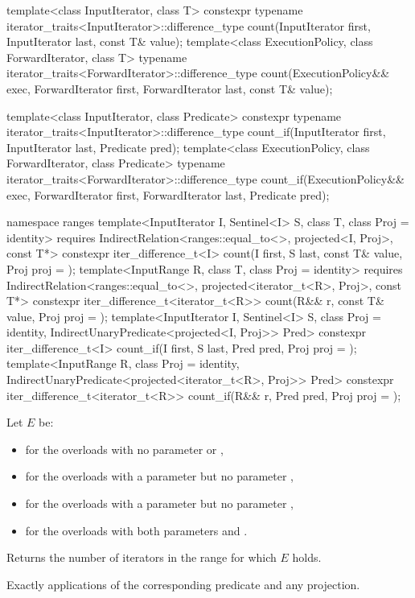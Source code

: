 %
%
\begin{itemdecl}
template<class InputIterator, class T>
  constexpr typename iterator_traits<InputIterator>::difference_type
    count(InputIterator first, InputIterator last, const T& value);
template<class ExecutionPolicy, class ForwardIterator, class T>
  typename iterator_traits<ForwardIterator>::difference_type
    count(ExecutionPolicy&& exec,
          ForwardIterator first, ForwardIterator last, const T& value);

template<class InputIterator, class Predicate>
  constexpr typename iterator_traits<InputIterator>::difference_type
    count_if(InputIterator first, InputIterator last, Predicate pred);
template<class ExecutionPolicy, class ForwardIterator, class Predicate>
  typename iterator_traits<ForwardIterator>::difference_type
    count_if(ExecutionPolicy&& exec,
             ForwardIterator first, ForwardIterator last, Predicate pred);

namespace ranges {
  template<InputIterator I, Sentinel<I> S, class T, class Proj = identity>
    requires IndirectRelation<ranges::equal_to<>, projected<I, Proj>, const T*>
    constexpr iter_difference_t<I>
      count(I first, S last, const T& value, Proj proj = {});
  template<InputRange R, class T, class Proj = identity>
    requires IndirectRelation<ranges::equal_to<>, projected<iterator_t<R>, Proj>, const T*>
    constexpr iter_difference_t<iterator_t<R>>
      count(R&& r, const T& value, Proj proj = {});
  template<InputIterator I, Sentinel<I> S, class Proj = identity,
      IndirectUnaryPredicate<projected<I, Proj>> Pred>
    constexpr iter_difference_t<I>
      count_if(I first, S last, Pred pred, Proj proj = {});
  template<InputRange R, class Proj = identity,
      IndirectUnaryPredicate<projected<iterator_t<R>, Proj>> Pred>
    constexpr iter_difference_t<iterator_t<R>>
      count_if(R&& r, Pred pred, Proj proj = {});
}
\end{itemdecl}

\begin{itemdescr}
\pnum
Let $E$ be:
\begin{itemize}
\item {} for the overloads
  with no parameter  or ,
\item {} for the overloads
  with a parameter  but no parameter ,
\item {} for the overloads
  with a parameter  but no parameter ,
\item {} for the overloads
  with both parameters  and .
\end{itemize}

\pnum
\effects
Returns the number of iterators
in the range 
for which $E$ holds.

\pnum
\complexity
Exactly
applications of the corresponding predicate and any projection.
\end{itemdescr}

